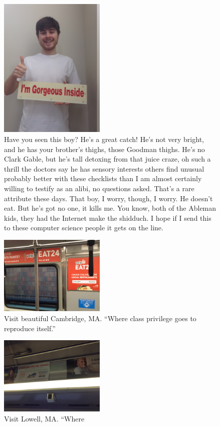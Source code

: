 \begin{figure}
\centering
\includegraphics[width=0.45\textwidth]{figures/ad.jpg}
\caption{Have you seen this boy? He's a great catch! He's not very bright, and he has your brother's thighs, those Goodman thighs. He's no Clark Gable, but he's \checkmark tall \checkmark detoxing from that juice craze, oh such a thrill \checkmark the doctors say he has sensory interests others find unusual \checkmark probably better with these checklists than I am \checkmark almost certainly willing to testify as an alibi, no questions asked. That's a rare attribute these days. That boy, I worry, though, I worry. He doesn't eat. But he's got no one, it kills me. You know, both of the Ableman kids, they had the Internet make the shidduch. I hope if I send this to these computer science people it gets on the line.}
\end{figure}

\begin{figure}
\centering
\includegraphics[width=0.45\textwidth]{figures/cambridge.jpg}
\caption{Visit beautiful Cambridge, MA. ``Where class privilege goes to reproduce itself.''}
\end{figure}

\begin{figure}
\centering
\includegraphics[width=0.45\textwidth]{figures/lowell.jpg}
\caption{Visit Lowell, MA. ``Where}
\end{figure}


